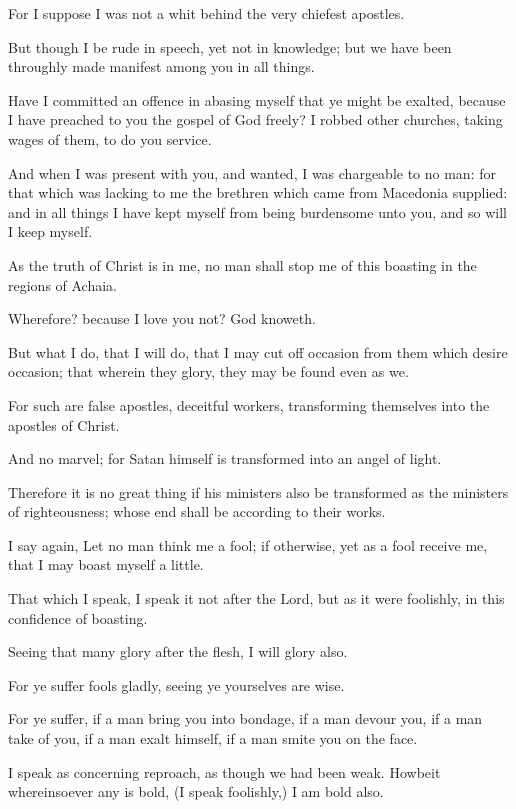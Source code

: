 \verse For I suppose I was not a whit behind the very chiefest apostles.

\verse But though I be rude in speech, yet not in knowledge; but we have been throughly made manifest among you in all things.

\verse Have I committed an offence in abasing myself that ye might be exalted, because I have preached to you the gospel of God freely?  \verse I robbed other churches, taking wages of them, to do you service.

\verse And when I was present with you, and wanted, I was chargeable to no man: for that which was lacking to me the brethren which came from Macedonia supplied: and in all things I have kept myself from being burdensome unto you, and so will I keep myself.

\verse As the truth of Christ is in me, no man shall stop me of this boasting in the regions of Achaia.

\verse Wherefore? because I love you not? God knoweth.

\verse But what I do, that I will do, that I may cut off occasion from them which desire occasion; that wherein they glory, they may be found even as we.

\verse For such are false apostles, deceitful workers, transforming themselves into the apostles of Christ.

\verse And no marvel; for Satan himself is transformed into an angel of light.

\verse Therefore it is no great thing if his ministers also be transformed as the ministers of righteousness; whose end shall be according to their works.

\verse I say again, Let no man think me a fool; if otherwise, yet as a fool receive me, that I may boast myself a little.

\verse That which I speak, I speak it not after the Lord, but as it were foolishly, in this confidence of boasting.

\verse Seeing that many glory after the flesh, I will glory also.

\verse For ye suffer fools gladly, seeing ye yourselves are wise.

\verse For ye suffer, if a man bring you into bondage, if a man devour you, if a man take of you, if a man exalt himself, if a man smite you on the face.

\verse I speak as concerning reproach, as though we had been weak.  Howbeit whereinsoever any is bold, (I speak foolishly,) I am bold also.

